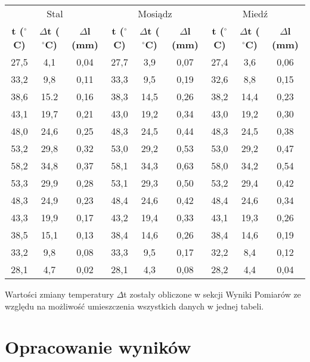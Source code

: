 \documentclass[10pt,a4paper]{article}
\newcommand{\forceindent}{\leavevmode{\parindent=3em\indent}}
\begin{document}
\begin{center}
\begin{tabular}{|c|c|c||c|c|c||c|c|c|}
\multicolumn{3}{c}{Stal} & \multicolumn{3}{c}{Mosiądz} & \multicolumn{3}{c}{Miedź}\\
\hhline{|=|=|=||=|=|=||=|=|=|}
\textbf{t ($^{\circ}$C)} & \textbf{$\Delta$t ($^{\circ}$C)} & \textbf{$\Delta$l (mm)} & \textbf{t ($^{\circ}$C)} & \textbf{$\Delta$t ($^{\circ}$C)} & \textbf{$\Delta$l (mm)} & \textbf{t ($^{\circ}$C)} & \textbf{$\Delta$t ($^{\circ}$C)} &  \textbf{$\Delta$l (mm)}\\
\hline
27,5 & 4,1 & 0,04 & 27,7 & 3,9 & 0,07 & 27,4 & 3,6 & 0,06\\
\hline
33,2 & 9,8 & 0,11 & 33,3 & 9,5 & 0,19 & 32,6 & 8,8 & 0,15\\
\hline
38,6 & 15.2 & 0,16 & 38,3 & 14,5 & 0,26 & 38,2 & 14,4 & 0,23\\
\hline
43,1 & 19,7 & 0,21 & 43,0 & 19,2 & 0,34 & 43,0 & 19,2 & 0,30\\
\hline
48,0 & 24,6 & 0,25 & 48,3 & 24,5 & 0,44 & 48,3 & 24,5 & 0,38\\
\hline
53,2 & 29,8 & 0,32 & 53,0 & 29,2 & 0,53 & 53,0 & 29,2 & 0,47\\
\hline
58,2 & 34,8 & 0,37 & 58,1 & 34,3 & 0,63 & 58,0 & 34,2 & 0,54\\
\hline
53,3 & 29,9 & 0,28 & 53,1 & 29,3 & 0,50 & 53,2 & 29,4 & 0,42\\
\hline
48,3 & 24,9  & 0,23 & 48,4 & 24,6 & 0,42 & 48,4 & 24,6 & 0,34\\
\hline
43,3 & 19,9 & 0,17 & 43,2 & 19,4 & 0,33 & 43,1 & 19,3 & 0,26\\
\hline
38,5 & 15,1 & 0,13 & 38,4 & 14,6 & 0,26 & 38,4 & 14,6 & 0,19\\
\hline
33,2 & 9,8 & 0,08 & 33,3 & 9,5 & 0,17 & 32,2 & 8,4 & 0,12\\
\hline
28,1 & 4,7 & 0,02 & 28,1 & 4,3 & 0,08 & 28,2 & 4,4 & 0,04\\
\hline

\end{tabular}
\end{center}
\vspace{10pt}

\forceindent Wartości zmiany temperatury $\Delta$t zostały obliczone w sekcji Wyniki Pomiarów ze względu na możliwość umieszczenia wszystkich danych w jednej tabeli.
\newpage
\section{Opracowanie wyników}
\end{document}
